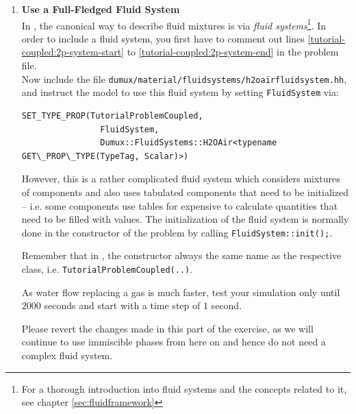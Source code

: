 \begin{enumerate}
\item \textbf{Use a Full-Fledged Fluid System} \\
  In \eWoms, the canonical way to describe fluid mixtures is via
  \textit{fluid systems}\footnote{For a thorough introduction into
    fluid systems and the concepts related to it, see chapter
    \ref{sec:fluidframework}}.  In order to include a fluid system,
  you first have to comment out lines
  \ref{tutorial-coupled:2p-system-start}
  to \ref{tutorial-coupled:2p-system-end} in the problem file.\\
  Now include the file
  \texttt{dumux/material/fluidsystems/h2oairfluidsystem.hh}, and
  instruct the model to use this fluid system by setting
  \texttt{FluidSystem} via:\\
\begin{lstlisting}[style=eWomsCode]
  SET_TYPE_PROP(TutorialProblemCoupled, 
                FluidSystem,
                Dumux::FluidSystems::H2OAir<typename GET\_PROP\_TYPE(TypeTag, Scalar)>)
\end{lstlisting}
However, this is a rather complicated fluid system which considers
mixtures of components and also uses tabulated components that need to
be initialized -- i.e. some components use tables for expensive to
calculate quantities that need to be filled with values.  The
initialization of the fluid system is normally done in the constructor
of the problem by calling \texttt{FluidSystem::init();}.

Remember that in \Cplusplus, the constructor always the same name as
the respective class, i.e. \texttt{TutorialProblemCoupled(..)}.

As water flow replacing a gas is much faster, test your simulation
only until $2000$ seconds and start with a time step of $1$ second.

Please revert the changes made in this part of the exercise, as we
will continue to use immiscible phases from here on and hence do not
need a complex fluid system.


\end{enumerate}
